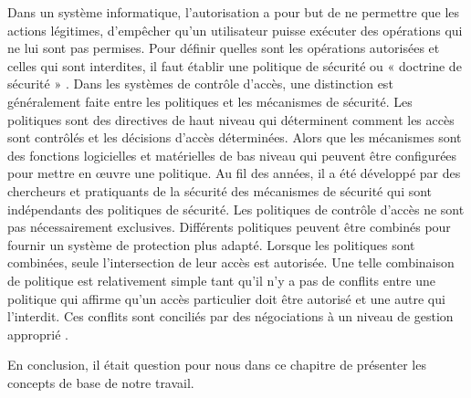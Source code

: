 \label{sectionPolitiqueSécurité}
Dans un système informatique, l'autorisation a pour but de ne permettre que les actions légitimes, d'empêcher qu'un utilisateur puisse exécuter des opérations qui ne lui sont pas permises. Pour définir quelles sont les opérations autorisées et celles qui sont interdites, il faut établir une politique de sécurité ou « doctrine de sécurité » \cite{theseBenoit}. Dans les systèmes de contrôle d'accès, une distinction est généralement faite entre les politiques et les mécanismes de sécurité. Les politiques sont des directives de haut niveau qui déterminent comment les accès sont contrôlés et les décisions d'accès déterminées. Alors que les mécanismes sont des fonctions logicielles et matérielles de bas niveau qui peuvent être configurées pour mettre en œuvre une politique. Au fil des années, il a été développé par des chercheurs et pratiquants de la sécurité des mécanismes de sécurité qui sont indépendants des politiques de sécurité. Les politiques de contrôle d'accès ne sont pas nécessairement exclusives. Différents politiques peuvent être combinés pour fournir un système de protection plus adapté. Lorsque les politiques sont combinées, seule l'intersection de leur accès est autorisée. Une telle combinaison de politique est relativement simple tant qu'il n'y a pas de conflits entre une politique qui affirme qu'un accès particulier doit être autorisé et une autre qui l'interdit. Ces conflits sont conciliés par des négociations à un niveau de gestion approprié \cite{sandhu94}.

\label{sectionConclusion}

En conclusion, il était question pour nous dans ce chapitre de présenter les concepts de base de notre travail.